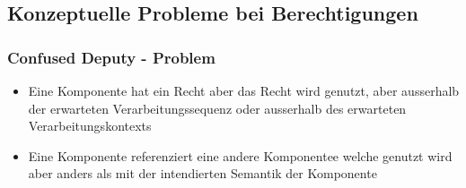 \documentclass{article} %
\begin{document}
	\subsection{Konzeptuelle Probleme bei Berechtigungen}
	\subsubsection{Confused Deputy - Problem}
	\begin{itemize}
		\item Eine Komponente hat ein Recht aber das Recht wird genutzt, aber ausserhalb der erwarteten Verarbeitungssequenz oder ausserhalb des erwarteten Verarbeitungskontexts
		\item Eine Komponente referenziert eine andere Komponentee welche genutzt wird aber anders als mit der intendierten Semantik der Komponente
	\end{itemize}
\end{document}
